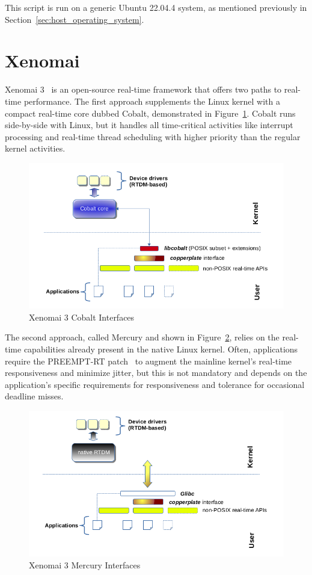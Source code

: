 \documentclass[MMR,Master,english]{style/twbook}
\begin{document}
\noindent This script is run on a generic Ubuntu 22.04.4 system, as mentioned previously in Section~\ref{sec:host_operating_system}.

\clearpage

\section{Xenomai}\label{sec:xenomai}

Xenomai 3~\cite{XenomaiXenomai} is an open-source real-time framework that offers two paths to real-time performance. The first approach supplements the Linux kernel with a compact real-time core dubbed Cobalt, demonstrated in Figure~\ref{fig:cobalt}. Cobalt runs side-by-side with Linux, but it handles all time-critical activities like interrupt processing and real-time thread scheduling with higher priority than the regular kernel activities.

\begin{figure}[H]
	\centering
	\includegraphics[width=0.6\columnwidth]{img/introduction/xenomai/x3-cobalt-interfaces.png}
	\caption[Xenomai 3 Cobalt Interfaces]{Xenomai 3 Cobalt Interfaces~\cite{OverviewXenomai}}
	\label{fig:cobalt}
\end{figure}

\noindent  The second approach, called Mercury and shown in Figure~\ref{fig:mercury}, relies on the real-time capabilities already present in the native Linux kernel. Often, applications require the PREEMPT-RT patch~\cite{RealtimePreempt_rt_versionsWiki} to augment the mainline kernel's real-time responsiveness and minimize jitter, but this is not mandatory and depends on the application's specific requirements for responsiveness and tolerance for occasional deadline misses.

\begin{figure}[H]
	\centering
	\includegraphics[width=0.6\columnwidth]{img/introduction/xenomai/x3-mercury-interfaces.png}
	\caption[Xenomai 3 Mercury Interfaces]{Xenomai 3 Mercury Interfaces~\cite{OverviewXenomai}}
	\label{fig:mercury}
\end{figure}
\end{document}
